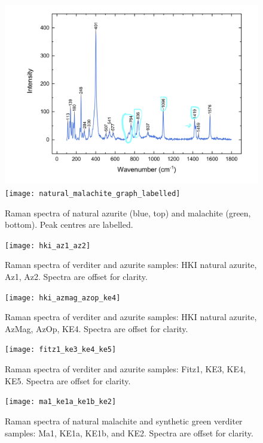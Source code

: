 \begin{figure}[H]
\centering
\begin{minipage}[t]{\linewidth}
  \centering
  \includegraphics[width=0.9\linewidth]{az1_blue_withlabels}
\hfill
\texttt{[image: natural\_malachite\_graph\_labelled]}
\hfill
\end{minipage}
\caption[Raman spectra of natural azurite and malachite, peak centres labelled.]{Raman spectra of natural azurite (blue, top) and malachite (green, bottom). Peak centres are labelled.}
\label{fig:label_raman}
\end{figure}

\begin{figure}[H]
\centering
  \texttt{[image: hki\_az1\_az2]}
\caption[Raman spectra of blue samples.]{Raman spectra of verditer and azurite samples: HKI natural azurite, Az1, Az2. Spectra are offset for clarity.}
\label{fig:blue_comparison1}
\end{figure}

\begin{figure}[H]
  \centering
  \texttt{[image: hki\_azmag\_azop\_ke4]}
\caption[Raman spectra of blue samples.]{Raman spectra of verditer and azurite samples: HKI natural azurite, AzMag, AzOp, KE4. Spectra are offset for clarity.}
\label{fig:blue_comparison2}
\end{figure}

\begin{figure}[H]
  \centering
  \texttt{[image: fitz1\_ke3\_ke4\_ke5]}
\caption[Raman spectra of blue samples.]{Raman spectra of verditer and azurite samples: Fitz1, KE3, KE4, KE5. Spectra are offset for clarity.}
\label{fig:blue_comparison3}
\end{figure}

\begin{figure}[H]
\centering
  \texttt{[image: ma1\_ke1a\_ke1b\_ke2]}
\caption[Raman spectra of green samples.]{Raman spectra of natural malachite and synthetic green verditer samples: Ma1, KE1a, KE1b, and KE2. Spectra are offset for clarity.}
\label{fig:green_comparison}
\end{figure}

